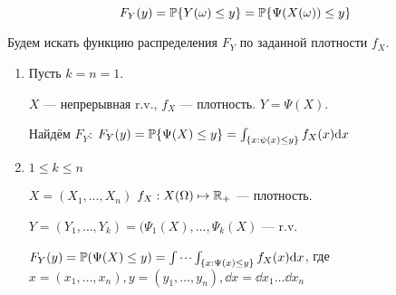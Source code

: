 \[F_Y(y) = \mathbb P \{Y(\omega) \leq y\} = \mathbb P \{ \Psi(X(\omega)) \leq y\}\]

Будем искать функцию распределения \(F_Y\) по заданной плотности
\(f_X\).

\begin{enumerate}
\def\labelenumi{\arabic{enumi}.}
\item
  Пусть \(k=n=1\).

  \(X\) --- непрерывная r.v., \(f_X\) --- плотность. \(Y = \Psi(X)\).

  Найдём \(F_Y\):
  \(F_Y(y) = \mathbb P\{\Psi(X)\leq y\} = \int_{\{x: \psi(x) \leq y\}} f_X(x) \mathrm d x\)
\item
  \(1 \leq k \leq n\)

  \(X = (X_1, \ldots, X_n)\) \(f_X : X(\Omega)\mapsto\mathbb R_+\) ---
  плотность.

  \(Y = (Y_1, \ldots, Y_k) = (\Psi_1(X), \ldots, \Psi_k(X)\) --- r.v.

  \(F_Y(y) = \mathbb P(\Psi(X)\leq y) = \idotsint_{\{ x: \Psi(x) \leq y \}} f_X(x) \mathrm d x\),
  где
  \({x=(x_1, \ldots, x_n)}, {y=(y_1,\ldots,y_n)}, {\dd x = \dd x_1 \ldots \dd x_n}\)
\end{enumerate}
